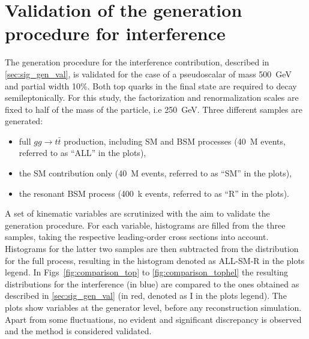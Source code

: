 \graphicspath{{chapt_dutch/}{intro/}{chapt2/}{chapt3/}{chapt4/}{chapt5/}{chapt6/}{chapt7/}}

\renewcommand\evenpagerightmark{{\scshape\small Appendix B}}
\renewcommand\oddpageleftmark{{\scshape\small Validation of the generation procedure for interferenc}}

\renewcommand{\bibname}{References}

\hyphenation{}

\chapter[Validation of the generation procedure for interference]%
{Validation of the generation procedure for interference}\label{app3}
%
The generation procedure for the interference contribution, described in \ref{sec:sig_gen_val}, is validated for the case of a pseudoscalar of mass 500~GeV and partial width 10\%.
Both top quarks in the final state are required to decay semileptonically.
For this study, the factorization and renormalization scales are fixed to half of the mass of the particle, i.e 250~GeV.
Three different samples are generated:
\begin{itemize}
\item full $gg \rightarrow t\bar t$ production, including SM and BSM processes (40~M events, referred to as ``ALL'' in the plots),
\item the SM contribution only (40~M events, referred to as ``SM'' in the plots),
\item the resonant BSM process (400~k events, referred to as ``R'' in the plots).
\end{itemize}
A set of kinematic variables are scrutinized with the aim to validate the generation procedure.
For each variable, histograms are filled from the three samples, taking the respective leading-order cross sections into account.
Histograms for the latter two samples are then subtracted from the distribution for the full process, resulting in the histogram denoted as ALL-SM-R in the plots legend.
In Figs~\ref{fig:comparison_top} to \ref{fig:comparison_tophel} the resulting distributions for the interference (in blue) are compared to the ones obtained as described in \ref{sec:sig_gen_val} (in red, denoted as I in the plots legend).
The plots show variables at the generator level, before any reconstruction simulation.
Apart from some fluctuations, no evident and significant discrepancy is observed and the method is considered validated.

